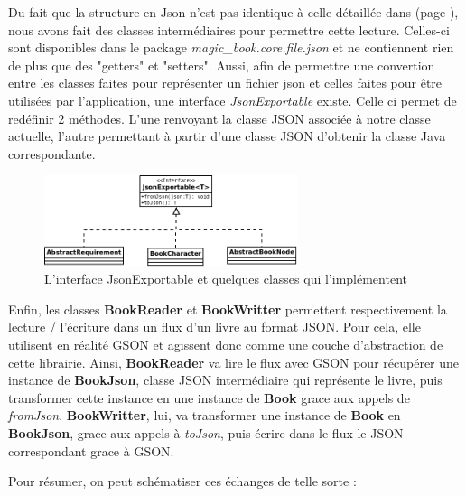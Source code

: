 			Du fait que la structure en Json n'est pas identique à celle détaillée dans  (page \pageref{sec:representation_livre}), nous avons fait des classes intermédiaires pour permettre cette lecture. Celles-ci sont disponibles dans le package \textit{magic\_book.core.file.json} et ne contiennent rien de plus que des "getters" et "setters". Aussi, afin de permettre une convertion entre les classes faites pour représenter un fichier json et celles faites pour être utilisées par l'application, une interface \textit{JsonExportable} existe. Celle ci permet de redéfinir 2 méthodes. L'une renvoyant la classe JSON associée à notre classe actuelle, l'autre permettant à partir d'une classe JSON d'obtenir la classe Java correspondante.

			\begin{figure}[H]
				\centering\includegraphics[width=0.66\textwidth, keepaspectratio]{img/json_exportable.png}
				\caption{L'interface JsonExportable et quelques classes qui l'implémentent}
			\end{figure}

			Enfin, les classes \textbf{BookReader} et \textbf{BookWritter} permettent respectivement la lecture / l'écriture dans un flux d'un livre au format JSON. Pour cela, elle utilisent en réalité GSON et agissent donc comme une couche d'abstraction de cette librairie. Ainsi, \textbf{BookReader} va lire le flux avec GSON pour récupérer une instance de \textbf{BookJson}, classe JSON intermédiaire qui représente le livre, puis transformer cette instance en une instance de \textbf{Book} grace aux appels de \textit{fromJson}. \textbf{BookWritter}, lui, va transformer une instance de \textbf{Book} en \textbf{BookJson}, grace aux appels à \textit{toJson}, puis écrire dans le flux le JSON correspondant grace à GSON.

			Pour résumer, on peut schématiser ces échanges de telle sorte :

